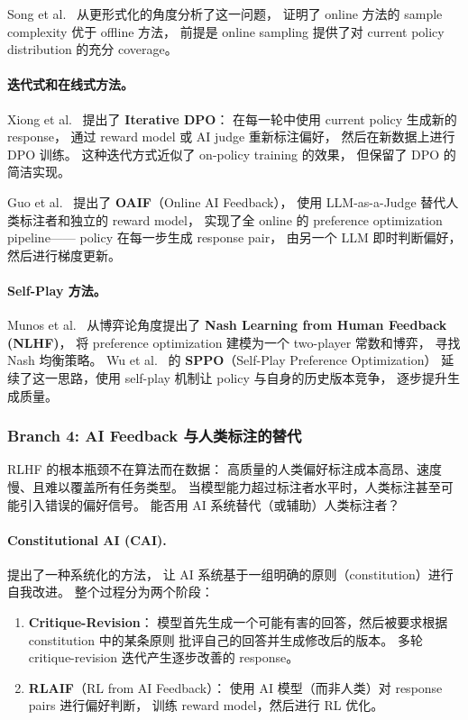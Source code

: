 Song et al.\ \cite{song2024coverage} 从更形式化的角度分析了这一问题，
证明了 online 方法的 sample complexity 优于 offline 方法，
前提是 online sampling 提供了对 current policy distribution 的充分 coverage。

\paragraph{迭代式和在线式方法。}
Xiong et al.\ \cite{xiong2023iterative} 提出了 \textbf{Iterative DPO}：
在每一轮中使用 current policy 生成新的 response，
通过 reward model 或 AI judge 重新标注偏好，
然后在新数据上进行 DPO 训练。
这种迭代方式近似了 on-policy training 的效果，
但保留了 DPO 的简洁实现。

Guo et al.\ \cite{guo2024oaif} 提出了 \textbf{OAIF}（Online AI Feedback），
使用 LLM-as-a-Judge 替代人类标注者和独立的 reward model，
实现了全 online 的 preference optimization pipeline——
policy 在每一步生成 response pair，
由另一个 LLM 即时判断偏好，然后进行梯度更新。

\paragraph{Self-Play 方法。}
Munos et al.\ \cite{munos2024nlhf} 从博弈论角度提出了
\textbf{Nash Learning from Human Feedback (NLHF)}，
将 preference optimization 建模为一个 two-player 常数和博弈，
寻找 Nash 均衡策略。
Wu et al.\ \cite{wu2024sppo} 的 \textbf{SPPO}（Self-Play Preference Optimization）
延续了这一思路，使用 self-play 机制让 policy 与自身的历史版本竞争，
逐步提升生成质量。

\subsubsection{Branch 4: AI Feedback 与人类标注的替代}
\label{sec:t2-ai-feedback}

\begin{problembox}
RLHF 的根本瓶颈不在算法而在数据：
高质量的人类偏好标注成本高昂、速度慢、且难以覆盖所有任务类型。
当模型能力超过标注者水平时，人类标注甚至可能引入错误的偏好信号。
能否用 AI 系统替代（或辅助）人类标注者？
\end{problembox}

\paragraph{Constitutional AI (CAI).}
 提出了一种系统化的方法，
让 AI 系统基于一组明确的原则（constitution）进行自我改进。
整个过程分为两个阶段：
\begin{enumerate}[leftmargin=2em]
  \item \textbf{Critique-Revision}：
    模型首先生成一个可能有害的回答，然后被要求根据 constitution 中的某条原则
    批评自己的回答并生成修改后的版本。
    多轮 critique-revision 迭代产生逐步改善的 response。
  \item \textbf{RLAIF}（RL from AI Feedback）：
    使用 AI 模型（而非人类）对 response pairs 进行偏好判断，
    训练 reward model，然后进行 RL 优化。
\end{enumerate}

